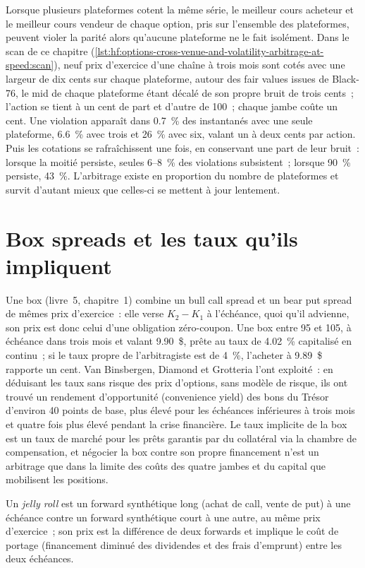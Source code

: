 Lorsque plusieurs plateformes cotent la même série, le meilleur cours acheteur et le meilleur cours vendeur de chaque option, pris sur l'ensemble des plateformes, peuvent violer la parité alors qu'aucune plateforme ne le fait isolément.
Dans le scan de ce chapitre (\cref{lst:hf:options-cross-venue-and-volatility-arbitrage-at-speed:scan}), neuf prix d'exercice d'une chaîne à trois mois sont cotés avec une largeur de dix
cents sur chaque plateforme, autour des fair values issues de Black-76, le mid de chaque plateforme étant décalé de son propre bruit de trois cents~; l'action se tient à un cent de part et d'autre de
100~; chaque jambe coûte un cent. Une violation apparaît dans 0.7~\% des instantanés avec une seule plateforme, 6.6~\% avec trois et 26~\% avec six, valant un à deux cents par
action. Puis les cotations se rafraîchissent une fois, en conservant une part de leur bruit~: lorsque la moitié persiste, seules 6--8~\% des violations subsistent~; lorsque 90~\%
persiste, 43~\%. L'arbitrage existe en proportion du nombre de plateformes et survit d'autant mieux que celles-ci se mettent à jour lentement.

\section{Box spreads et les taux qu'ils impliquent}

Une box (livre~5, chapitre~1) combine un bull call spread et un bear put spread de mêmes prix d'exercice~: elle verse $K_2-K_1$ à l'échéance, quoi
qu'il advienne, son prix est donc celui d'une obligation zéro-coupon. Une box entre 95 et 105, à échéance dans trois mois et valant 9.90~\$, prête au taux de 4.02~\% capitalisé en continu~; si
le taux propre de l'arbitragiste est de 4~\%, l'acheter à 9.89~\$ rapporte un cent. Van Binsbergen, Diamond et Grotteria l'ont exploité~: en déduisant les taux sans risque des
prix d'options, sans modèle de risque, ils ont trouvé un rendement d'opportunité (convenience yield) des bons du Trésor d'environ 40 points de base, plus élevé pour les échéances inférieures à trois mois et
quatre fois plus élevé pendant la crise financière. Le taux implicite de la box est un taux de marché pour les prêts garantis par du collatéral via la chambre de compensation, et négocier
la box contre son propre financement n'est un arbitrage que dans la limite des coûts des quatre jambes et du capital que mobilisent les positions.

\begin{definition}\label{def:hf:options-cross-venue-and-volatility-arbitrage-at-speed:jelly}
Un \emph{jelly roll} est un forward synthétique long (achat de call, vente de put) à une échéance contre un forward synthétique court à une autre,
au même prix d'exercice~; son prix est la différence de deux forwards et implique le coût de portage (financement diminué des dividendes et des frais d'emprunt) entre les deux
échéances.
\end{definition}

